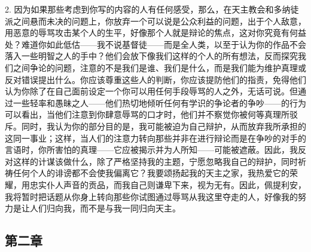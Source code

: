 2. 因为如果那些考虑到你写的内容的人有任何感受，那么，在天主教会和多纳徒派之间悬而未决的问题上，你放弃一个可以说是公众利益的问题，出于个人敌意，用恶意的辱骂攻击某个人的生平，好像那个人就是辩论的焦点，这对你究竟有何益处？难道你如此低估——我不说基督徒——而是全人类，以至于认为你的作品不会落入一些明智之人的手中？他们会放下像我们这样的个人的所有想法，反而探究我们之间争论的问题，注意的不是我们是谁、我们是什么，而是我们能为维护真理或反对错误提出什么。你应该尊重这些人的判断，你应该提防他们的指责，免得他们认为你除了在自己面前设定一个你可以用任何手段辱骂的人之外，无话可说。但通过一些轻率和愚昧之人——他们热切地倾听任何有学识的争论者的争吵——的行为可以看出，当他们注意到你肆意辱骂的口才时，他们并不察觉你被何等真理所驳斥。同时，我认为你的部分目的是，我可能被迫为自己辩护，从而放弃我所承担的这同一事业；这样，当人们的注意力转向那些并非在进行辩论而是在争吵的对手的言语时，你所害怕的真理——它应被揭示并为人所知——可能被遮蔽。因此，我反对这样的计谋该做什么，除了严格坚持我的主题，宁愿忽略我自己的辩护，同时祈祷任何个人的诽谤都不会使我偏离它？我要颂扬起我的天主之家，我热爱它的荣耀，用忠实仆人声音的贡品，而我自己则谦卑下来，视为无有。因此，佩提利安，我将暂时把话题从你身上转向那些你试图通过辱骂从我这里夺走的人，好像我的努力是让人们归向我，而不是与我一同归向天主。\par


\subsection{第二章}


